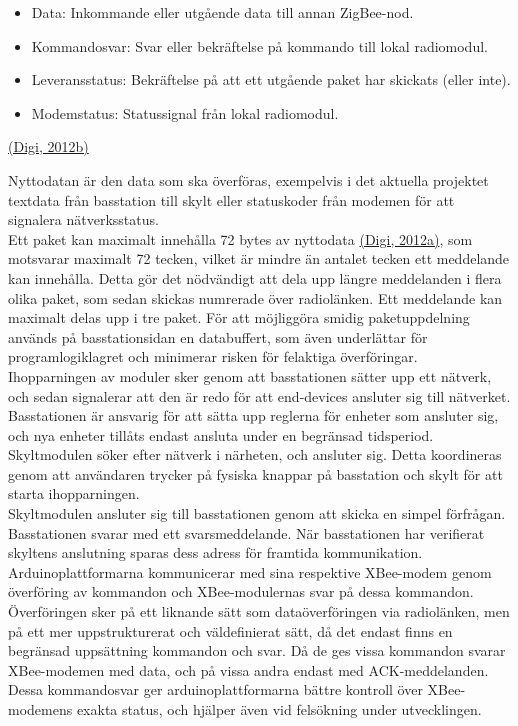 \documentclass[a4paper,11pt]{article}
\begin{document}
	\begin{itemize}
    	\item Data: Inkommande eller utgående data till annan ZigBee-nod.
    	\item Kommandosvar: Svar eller bekräftelse på kommando till lokal radiomodul.
    	\item Leveransstatus: Bekräftelse på att ett utgående paket har skickats (eller inte).
    	\item Modemstatus: Statussignal från lokal radiomodul.
    	\end{itemize}
\hyperref[digi]{(Digi, 2012b)}

Nyttodatan är den data som ska överföras, exempelvis i det aktuella projektet textdata från basstation till skylt eller statuskoder från modemen för att signalera nätverksstatus. \\

Ett paket kan maximalt innehålla 72 bytes av nyttodata \hyperref[digi]{(Digi, 2012a)}, som motsvarar maximalt 72 tecken, vilket är mindre än antalet tecken ett meddelande kan innehålla. Detta gör det nödvändigt att dela upp längre meddelanden i flera olika paket, som sedan skickas numrerade över radiolänken. Ett meddelande kan maximalt delas upp i tre paket. För att möjliggöra smidig paketuppdelning används på basstationsidan en databuffert, som även underlättar för programlogiklagret och minimerar risken för felaktiga överföringar. \\

Ihopparningen av moduler sker genom att basstationen sätter upp ett nätverk, och sedan signalerar att den är redo för att end-devices ansluter sig till nätverket. Basstationen är ansvarig för att sätta upp reglerna för enheter som ansluter sig, och nya enheter tillåts endast ansluta under en begränsad tidsperiod. Skyltmodulen söker efter nätverk i närheten, och ansluter sig. Detta koordineras genom att användaren trycker på fysiska knappar på basstation och skylt för att starta ihopparningen. \\

Skyltmodulen ansluter sig till basstationen genom att skicka en simpel förfrågan. Basstationen svarar med ett svarsmeddelande. När basstationen har verifierat skyltens anslutning sparas dess adress för framtida kommunikation. \\

Arduinoplattformarna kommunicerar med sina respektive XBee-modem genom överföring av kommandon och XBee-modulernas svar på dessa kommandon. Överföringen sker på ett liknande sätt som dataöverföringen via radiolänken, men på ett mer uppstrukturerat och väldefinierat sätt, då det endast finns en begränsad uppsättning kommandon och svar. Då de ges vissa kommandon svarar XBee-modemen med data, och på vissa andra endast med ACK-meddelanden. Dessa kommandosvar ger arduinoplattformarna bättre kontroll över XBee-modemens exakta status, och hjälper även vid felsökning under utvecklingen. \\
\end{document}

